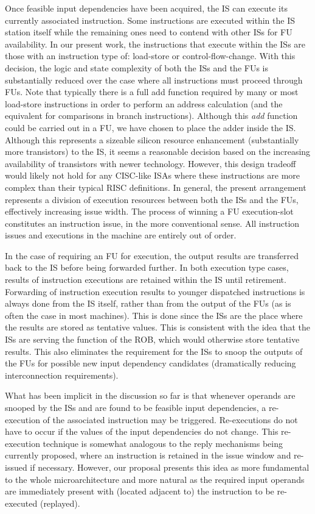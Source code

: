 \documentclass[10pt,dvips]{article}
\begin{document}
Once feasible input dependencies have been acquired, the
IS can execute its currently associated instruction.
Some instructions are executed within the IS station itself
while the remaining ones need to 
contend with other ISs for FU availability.
In our present work, the instructions that execute within the
ISs are those with an instruction type of: load-store or
control-flow-change.
With this decision, the logic and state complexity of both the ISs
and the FUs is substantially reduced over
the case where all instructions must proceed through FUs.
Note that typically there is a full add function required by
many or most load-store instructions in order to perform an
address calculation (and the equivalent for comparisons in branch
instructions).
Although this \textit{add} function could be carried out in a
FU, we have chosen to place the adder inside the 
IS.
Although this represents a sizeable silicon resource enhancement
(substantially more transistors) to the IS, it seems
a reasonable decision based on the increasing availability of
transistors with newer technology.
However, this design tradeoff would likely not hold for any CISC-like
ISAs where these instructions are more complex than their
typical RISC definitions.
In general, 
the present arrangement represents a division of execution resources
between both the ISs and the FUs,
effectively increasing issue width.
The process of winning a FU execution-slot constitutes
an instruction issue, in the more conventional sense.
All instruction issues and executions in the machine are entirely out of order.

In the case of requiring an FU for execution, the output results are
transferred back to the IS before being forwarded further.
In both execution type cases,
results of instruction executions are retained within
the IS until retirement.  
Forwarding of instruction execution
results to younger dispatched instructions is 
always done from the IS itself, rather
than from the output of the FUs
(as is often the case in most machines).
This is done since the ISs are the place
where the results are stored as tentative values.
This is consistent with the idea that the ISs are
serving the function of the ROB, which would otherwise
store tentative results.
This also eliminates the requirement for the ISs to
snoop the outputs of the 
FUs for possible new input dependency candidates (dramatically
reducing interconnection requirements).

What has been implicit in the discussion so far is that whenever
operands are snooped by the ISs and are found to be feasible
input dependencies, a re-execution of the associated instruction
may be triggered.
Re-executions do not have to occur if the values of the
input dependencies do not change.
This re-execution technique is somewhat analogous to 
the reply mechanisms being currently proposed,
where an instruction is retained in the issue window and re-issued
if necessary.
However, our proposal presents this idea as
more fundamental to the whole microarchitecture
and more natural as the required input operands 
are immediately present with (located adjacent to)
the instruction to be re-executed (replayed).
\end{document}
